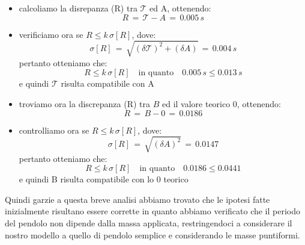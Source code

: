\begin{itemize}
	\item{calcoliamo la disrepanza (R) tra $\mathcal{T}$ ed A, ottenendo:
			\begin{equation*}
				R \,=\, \mathcal{T} - A \,=\, 0.005 \,s
			\end{equation*}
			}
	\item{verificiamo ora se $R \leq k\,\sigma[R]$, dove:
			\begin{equation*}
				\sigma[R] \,=\, \sqrt{(\delta \mathcal{T})^2 + (\delta A)} \,=\, 0.004 \, s
			\end{equation*}
			pertanto otteniamo che:
			\begin{equation*}
				R \leq k\,\sigma[R] \quad \text{in quanto} \quad 0.005 \, s \leq 0.013 \, s
			\end{equation*}
			e quindi $\mathcal{T}$ risulta compatibile con A}
	\item{troviamo ora la discrepanza (R) tra $B$ ed il valore teorico 0, ottenendo:
			\begin{equation*}
				R \,=\, B - 0 \,=\, 0.0186
			\end{equation*}
			}
	\item{controlliamo ora se $R \leq k\,\sigma[R]$, dove:
			\begin{equation*}
				\sigma[R] \,=\, \sqrt{(\delta A)^2} \,=\, 0.0147	
			\end{equation*}
			pertanto otteniamo che:
			\begin{equation*}
				R \leq k\,\sigma[R] \quad \text{in quanto} \quad 0.0186 \leq 0.0441
			\end{equation*}
			e quindi B risulta compatibile con lo 0 teorico}			
\end{itemize}
Quindi garzie a questa breve analisi abbiamo trovato che le ipotesi fatte inizialmente risultano essere corrette in quanto abbiamo verificato che il periodo del pendolo non dipende dalla massa applicata, restringendoci a considerare il nostro modello a quello di pendolo semplice e considerando le masse puntiformi.

